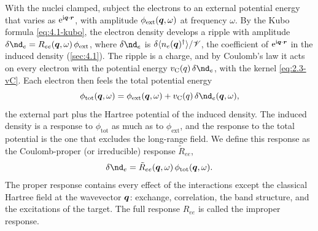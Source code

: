 With the nuclei clamped, subject the electrons to an external potential energy that varies as $\mathrm{e}^{\mathrm{i}\bm{q}\cdot\bm{r}}$, with amplitude $\phi_{\mathrm{ext}}(\bm{q},\omega)$ at frequency $\omega$. By the Kubo formula \cref{eq:4.1-kubo}, the electron density develops a ripple with amplitude $\delta\nd_e = R_{ee}(\vect{q},\omega)\,\phi_{\mathrm{ext}}$, where $\delta\nd_e$ is $\delta\langle n_e(\bm{q})^\dagger\rangle/\mathscr{V}$, the coefficient of $\mathrm{e}^{\mathrm{i}\bm{q}\cdot\bm{r}}$ in the induced density (\cref{sec:4.1}). The ripple is a charge, and by Coulomb's law it acts on every electron with the potential energy $v_{\mathrm{C}}(q)\,\delta\nd_e$, with the kernel \cref{eq:2.3-vC}. Each electron then feels the total potential energy
\begin{equation}
  \phi_{\mathrm{tot}}(\vect{q},\omega) = \phi_{\mathrm{ext}}(\vect{q},\omega) + v_{\mathrm{C}}(q)\,\delta\nd_e(\vect{q},\omega) ,
  \label{eq:4.4-phitot}
\end{equation}
the external part plus the Hartree potential of the induced density. The induced density is a response to $\phi_{\mathrm{tot}}$ as much as to $\phi_{\mathrm{ext}}$, and the response to the total potential is the one that excludes the long-range field. We define this response as the Coulomb-proper (or irreducible) response $\tilde R_{ee}$,
\begin{equation}
  \delta\nd_e = \tilde R_{ee}(\vect{q},\omega)\,\phi_{\mathrm{tot}}(\vect{q},\omega) .
  \label{eq:4.4-proper}
\end{equation}
The proper response contains every effect of the interactions except the classical Hartree field at the wavevector $\bm{q}$: exchange, correlation, the band structure, and the excitations of the target. The full response $R_{ee}$ is called the improper response.

